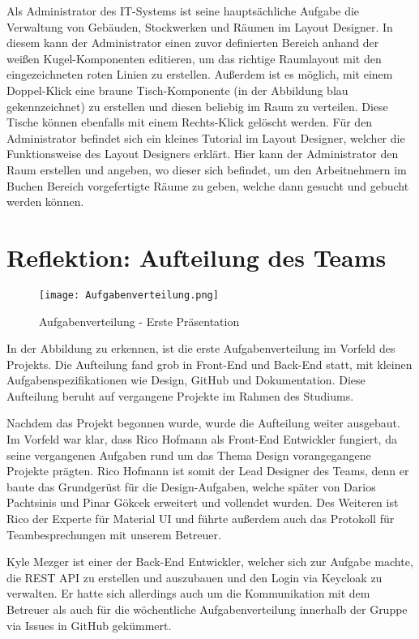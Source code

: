Als Administrator des IT-Systems ist seine hauptsächliche Aufgabe die Verwaltung von Gebäuden, Stockwerken und Räumen im Layout Designer.
In diesem kann der Administrator einen zuvor definierten Bereich anhand der weißen Kugel-Komponenten editieren, um das richtige Raumlayout mit den eingezeichneten roten Linien zu erstellen.
Außerdem ist es möglich, mit einem Doppel-Klick eine braune Tisch-Komponente (in der Abbildung blau gekennzeichnet) zu erstellen und diesen beliebig im Raum zu verteilen.
Diese Tische können ebenfalls mit einem Rechts-Klick gelöscht werden.
Für den Administrator befindet sich ein kleines Tutorial im Layout Designer, welcher die Funktionsweise des Layout Designers erklärt.
Hier kann der Administrator den Raum erstellen und angeben, wo dieser sich befindet, um den Arbeitnehmern im Buchen Bereich vorgefertigte Räume zu geben, welche dann gesucht und gebucht werden können.

\pagebreak

\section{Reflektion: Aufteilung des Teams}

\begin{figure}[!h]
    \centering
    \texttt{[image: Aufgabenverteilung.png]}
    \caption{Aufgabenverteilung - Erste Präsentation}
    \label{fig:Aufgabenverteilung}
\end{figure}

In der Abbildung zu erkennen, ist die erste Aufgabenverteilung im Vorfeld des Projekts.
Die Aufteilung fand grob in Front-End und Back-End statt, mit kleinen Aufgabenspezifikationen wie Design, GitHub und Dokumentation.
Diese Aufteilung beruht auf vergangene Projekte im Rahmen des Studiums.

Nachdem das Projekt begonnen wurde, wurde die Aufteilung weiter ausgebaut.
Im Vorfeld war klar, dass Rico Hofmann als Front-End Entwickler fungiert, da seine vergangenen Aufgaben rund um das Thema Design vorangegangene Projekte prägten.
Rico Hofmann ist somit der Lead Designer des Teams, denn er baute das Grundgerüst für die Design-Aufgaben, welche später von Darios Pachtsinis und Pinar Gökcek erweitert und vollendet wurden.
Des Weiteren ist Rico der Experte für Material UI und führte außerdem auch das Protokoll für Teambesprechungen mit unserem Betreuer.

Kyle Mezger ist einer der Back-End Entwickler, welcher sich zur Aufgabe machte, die REST API zu erstellen und auszubauen und den Login via Keycloak zu verwalten.
Er hatte sich allerdings auch um die Kommunikation mit dem Betreuer als auch für die wöchentliche Aufgabenverteilung innerhalb der Gruppe via Issues in GitHub gekümmert.

